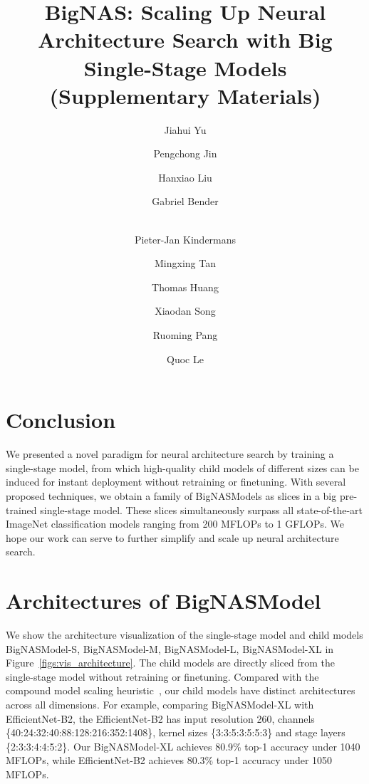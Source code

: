 \documentclass[runningheads]{llncs}
\begin{document}
\section{Conclusion}
We presented a novel paradigm for neural architecture search by training a single-stage model, from which high-quality child models of different sizes can be induced for instant deployment without retraining or finetuning. With several proposed techniques, we obtain a family of BigNASModels as slices in a big pre-trained single-stage model. These slices simultaneously surpass all state-of-the-art ImageNet classification models ranging from 200 MFLOPs to 1 GFLOPs. We hope our work can serve to further simplify and scale up neural architecture search. 
\clearpage




\title{BigNAS: Scaling Up Neural Architecture Search with Big Single-Stage Models\\
\vspace{2mm}
(Supplementary Materials)}


\author{Jiahui Yu \and
Pengchong Jin \and
Hanxiao Liu \and
Gabriel Bender \and\\
Pieter-Jan Kindermans \and
Mingxing Tan \and
Thomas Huang \and
Xiaodan Song \and
Ruoming Pang \and
Quoc Le
}



\maketitle
\appendix

\section{Architectures of BigNASModel}
We show the architecture visualization of the single-stage model and child models BigNASModel-S, BigNASModel-M, BigNASModel-L, BigNASModel-XL in Figure~\ref{figs:vis_architecture}. The child models are directly sliced from the single-stage model without retraining or finetuning. Compared with the compound model scaling heuristic~\cite{tan2019efficientnet}, our child models have distinct architectures across all dimensions. For example, comparing BigNASModel-XL with EfficientNet-B2, the EfficientNet-B2 has input resolution 260,  channels {\tiny\{40:24:32:40:88:128:216:352:1408\}}, kernel sizes {\tiny\{3:3:5:3:5:5:3\}} and stage layers {\tiny\{2:3:3:4:4:5:2\}}. Our BigNASModel-XL achieves 80.9\% top-1 accuracy under 1040 MFLOPs, while EfficientNet-B2 achieves 80.3\% top-1 accuracy under 1050 MFLOPs.
\end{document}
